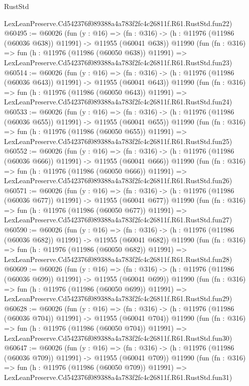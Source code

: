 \begin{lexlean}{RustStd}
\begin{coremodule}
    LexLeanPreserve.Cd542376f089388a4a783f2fc4c26811f.R61.RustStd.fun22)
@60495 := @60026
    (fun (y : @16) =>
    (fn : @316) -> (h : @11976 (@11986 (@60036 @638)) @11991) -> @11955 (@60041 @638))
    @11990
    (fun (fn : @316) =>
    fun (h : @11976 (@11986 (@60050 @638)) @11991) =>
    LexLeanPreserve.Cd542376f089388a4a783f2fc4c26811f.R61.RustStd.fun23)
@60514 := @60026
    (fun (y : @16) =>
    (fn : @316) -> (h : @11976 (@11986 (@60036 @643)) @11991) -> @11955 (@60041 @643))
    @11990
    (fun (fn : @316) =>
    fun (h : @11976 (@11986 (@60050 @643)) @11991) =>
    LexLeanPreserve.Cd542376f089388a4a783f2fc4c26811f.R61.RustStd.fun24)
@60533 := @60026
    (fun (y : @16) =>
    (fn : @316) -> (h : @11976 (@11986 (@60036 @655)) @11991) -> @11955 (@60041 @655))
    @11990
    (fun (fn : @316) =>
    fun (h : @11976 (@11986 (@60050 @655)) @11991) =>
    LexLeanPreserve.Cd542376f089388a4a783f2fc4c26811f.R61.RustStd.fun25)
@60552 := @60026
    (fun (y : @16) =>
    (fn : @316) -> (h : @11976 (@11986 (@60036 @666)) @11991) -> @11955 (@60041 @666))
    @11990
    (fun (fn : @316) =>
    fun (h : @11976 (@11986 (@60050 @666)) @11991) =>
    LexLeanPreserve.Cd542376f089388a4a783f2fc4c26811f.R61.RustStd.fun26)
@60571 := @60026
    (fun (y : @16) =>
    (fn : @316) -> (h : @11976 (@11986 (@60036 @677)) @11991) -> @11955 (@60041 @677))
    @11990
    (fun (fn : @316) =>
    fun (h : @11976 (@11986 (@60050 @677)) @11991) =>
    LexLeanPreserve.Cd542376f089388a4a783f2fc4c26811f.R61.RustStd.fun27)
@60590 := @60026
    (fun (y : @16) =>
    (fn : @316) -> (h : @11976 (@11986 (@60036 @682)) @11991) -> @11955 (@60041 @682))
    @11990
    (fun (fn : @316) =>
    fun (h : @11976 (@11986 (@60050 @682)) @11991) =>
    LexLeanPreserve.Cd542376f089388a4a783f2fc4c26811f.R61.RustStd.fun28)
@60609 := @60026
    (fun (y : @16) =>
    (fn : @316) -> (h : @11976 (@11986 (@60036 @699)) @11991) -> @11955 (@60041 @699))
    @11990
    (fun (fn : @316) =>
    fun (h : @11976 (@11986 (@60050 @699)) @11991) =>
    LexLeanPreserve.Cd542376f089388a4a783f2fc4c26811f.R61.RustStd.fun29)
@60628 := @60026
    (fun (y : @16) =>
    (fn : @316) -> (h : @11976 (@11986 (@60036 @704)) @11991) -> @11955 (@60041 @704))
    @11990
    (fun (fn : @316) =>
    fun (h : @11976 (@11986 (@60050 @704)) @11991) =>
    LexLeanPreserve.Cd542376f089388a4a783f2fc4c26811f.R61.RustStd.fun30)
@60647 := @60026
    (fun (y : @16) =>
    (fn : @316) -> (h : @11976 (@11986 (@60036 @709)) @11991) -> @11955 (@60041 @709))
    @11990
    (fun (fn : @316) =>
    fun (h : @11976 (@11986 (@60050 @709)) @11991) =>
    LexLeanPreserve.Cd542376f089388a4a783f2fc4c26811f.R61.RustStd.fun31)

\end{coremodule}
\end{lexlean}
